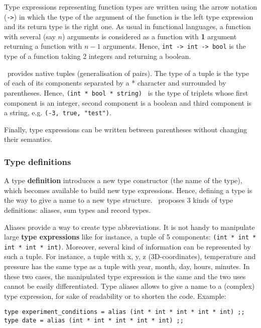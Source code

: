 Type expressions representing function types are written using the
arrow notation ({\tt ->}) in which the type of the argument of the
function is the left type expression and its return type is the right
one. As usual in functional languages, a function with several (say
$n$) arguments is considered as a function with {\bf 1} argument
returning a function with $n-1$ arguments. Hence,
{\tt int -> int -> bool} is the type of a function taking 2 integers
and returning a boolean.

\focal\ provides native tuples (generalisation of pairs). The type of
a tuple is the type of each of its components separated by a *
character and surrounded by parentheses. Hence,
{\tt (int * bool * string) } is the type of triplets whose first
component is an integer, second component is a boolean and third
component is a string, e.g. {\tt (-3, true, "test")}.

Finally, type expressions can be written between parentheses without
changing their semantics.

\subsubsection{Type definitions}
\label{type-definition}
A type {\bf definition} introduces  a new type
 constructor (the name of the type), which becomes available to build
new type expressions. Hence, defining a type is the
way to give a name to a new type structure. \focal\ proposes 3 kinds
of type definitions: aliases, sum types and record types.

\vspace{0.5cm}


\bigskip

Aliases provide a way to create type abbreviations. It is not handy to
manipulate large {\bf type expressions} like for instance, a tuple of
5 components: {\tt (int * int * int * int * int)}. Moreover, several
kind of information can be represented by such a
tuple. For instance, a tuple with x, y, z (3D-coordinates), temperature and
pressure has the same type as a tuple with year, month, day, hours, minutes. In
these two cases, the manipulated type expression is the same and
the two uses cannot be easily differentiated. Type aliases allows to
give a name to a
(complex) type expression, for sake of readability or to shorten the
code. Example:
{\scriptsize
\begin{lstlisting}
type experiment_conditions = alias (int * int * int * int * int) ;;
type date = alias (int * int * int * int * int) ;;
\end{lstlisting}
}

